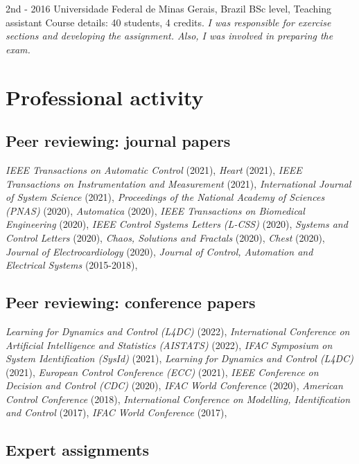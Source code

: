 \documentclass[10pt,letterpaper]{article} %
\begin{document}
    {   2nd - 2016  }
    { Universidade Federal de Minas Gerais, Brazil }
    { BSc level, Teaching assistant }
    { Course details: 40 students, 4 credits.  \emph{ I was responsible for exercise sections and developing the assignment. Also, I was involved in preparing the exam. } }
    




\section*{Professional activity}

\subsection*{Peer reviewing: journal papers}

 {\em IEEE Transactions on Automatic Control } (2021),  {\em Heart } (2021),  {\em IEEE Transactions on Instrumentation and Measurement } (2021),  {\em International Journal of System Science } (2021),  {\em Proceedings of the National Academy of Sciences (PNAS) } (2020),  {\em Automatica } (2020),  {\em IEEE Transactions on Biomedical Engineering } (2020),  {\em IEEE Control Systems Letters (L-CSS) } (2020),  {\em Systems and Control Letters } (2020),  {\em Chaos, Solutions and Fractals } (2020),  {\em Chest } (2020),  {\em Journal of Electrocardiology } (2020),  {\em Journal of Control, Automation and Electrical Systems } (2015-2018), 

\subsection*{Peer reviewing: conference papers}

 {\em Learning for Dynamics and Control (L4DC) } (2022),  {\em International Conference on Artificial Intelligence and Statistics (AISTATS) } (2022),  {\em IFAC Symposium on System Identification (SysId) } (2021),  {\em Learning for Dynamics and Control (L4DC) } (2021),  {\em European Control Conference (ECC) } (2021),  {\em IEEE Conference on Decision and Control (CDC) } (2020),  {\em IFAC World Conference } (2020),  {\em American Control Conference } (2018),  {\em International Conference on Modelling, Identification and Control } (2017),  {\em IFAC World Conference } (2017), 

\subsection*{Expert assignments}
\end{document}
